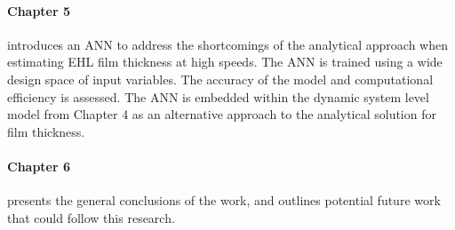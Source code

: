 \paragraph{Chapter 5} introduces an ANN  to address the shortcomings of the analytical approach when estimating EHL film thickness at high speeds. The ANN is trained using a wide design space of input variables. The accuracy of the model and computational efficiency is assessed. The ANN is embedded within the dynamic system level model from Chapter 4 as an alternative approach to the analytical solution for film thickness. 

\paragraph{Chapter 6} presents the general conclusions of the work, and outlines potential future work that could follow this research.